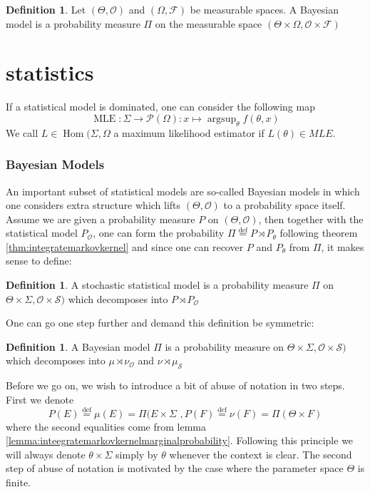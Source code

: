 \documentclass{book}
\theoremstyle{plain}
\theoremstyle{definition}
\newtheorem{definition}[corollary]{Definition}
\DeclareMathOperator{\argsup}{argsup}
\newcommand{\define}{\stackrel{\operatorname{def}}{=}}
\newcommand{\fun}{\mapsto}
\DeclareMathOperator{\Hom}{Hom}
\DeclareMathOperator{\MLE}{MLE}
\newcommand{\mor}{\longrightarrow}
\renewcommand{\r}[1]{\mathcal{#1}}
\begin{document}
\begin{definition}
Let $(\Theta,\r{O})$ and $(\Omega,\r{F})$ be measurable spaces.
A Bayesian model is a probability measure $\Pi$ on the measurable space $(\Theta\times \Omega, \r{O}\times\r{F})$
\end{definition}

\part{statistics}



If a statistical model is dominated, one can consider the following map
\[
\MLE: \Sigma\mor \r{P}(\Omega):x \fun \argsup_\theta f(\theta,x)
\]
We call $L \in \Hom(\Sigma,\Omega$ a maximum likelihood estimator if $L(\theta)\in MLE$.
\section{Bayesian Models}



An important subset of statistical models are so-called Bayesian models in which one considers extra structure which lifts $(\Theta,\r{O})$ to a probability space itself. Assume we are given a probability measure $P$ on $(\Theta,\r{O})$, then together with the statistical model $P_\r{O}$, one can form the probability $\Pi\define P\rtimes P_\theta$ following theorem \ref{thm:integratemarkovkernel}  and since one can recover $P$ and $P_\theta$ from $\Pi$, it makes sense to define:
\begin{definition}\label{def:stochasticmodel}
A stochastic statistical model is a probability measure $\Pi$ on $\Theta\times \Sigma, \r{O}\times \r{S})$ which decomposes into $P\rtimes P_\r{O}$
\end{definition}

One can go one step further and demand this definition be symmetric:

\begin{definition}\label{def:bayesianmodel}
A Bayesian model  $\Pi$ is a probability measure on $\Theta\times \Sigma, \r{O}\times \r{S})$ which decomposes into $\mu \rtimes \nu_\r{O}$ and $\nu\rtimes \mu_\r{S}$	
\end{definition}

Before we go on, we wish to introduce a bit of abuse of notation in two steps. First we denote
\[
P(E)\define \mu(E)=\Pi(E\times \Sigma \,\,, P(F)\define \nu(F)=\Pi(\Theta\times F)
\]
where the second equalities come from lemma \ref{lemma:inteegratemarkovkernelmarginalprobability}. Following this principle we will always denote $\theta \times \Sigma$ simply by $\theta$ whenever the context is clear.
The second step of abuse of notation is motivated by the case where the parameter space $\Theta$ is finite.\\
\end{document}
